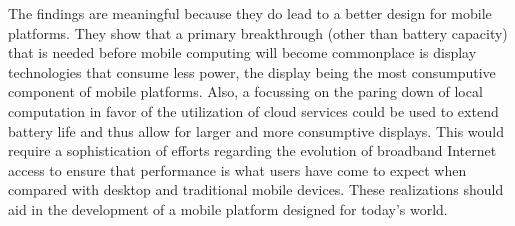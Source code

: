 
The findings are meaningful because they do lead to a better design for mobile
platforms.  They show that a primary breakthrough (other than battery capacity)
that is needed before mobile computing will become commonplace is display
technologies that consume less power, the display being the most consumputive
component of mobile platforms.  Also, a focussing on the paring down of local
computation in favor of the utilization of cloud services could be used to
extend battery life and thus allow for larger and more consumptive displays.
This would require a sophistication of efforts regarding the evolution of
broadband Internet access to ensure that performance is what users have come to
expect when compared with desktop and traditional mobile devices.  These
realizations should aid in the development of a mobile platform designed for
today's world.



